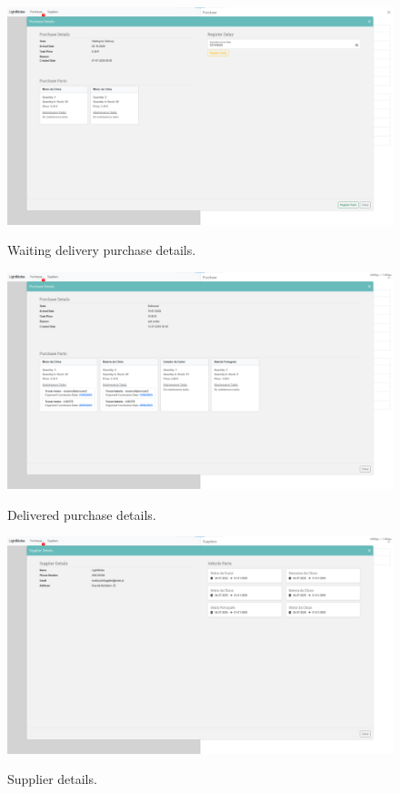 \begin{figure}[htbp]
  \caption{Waiting delivery purchase details.}
  \centering
  \includegraphics[width=\textwidth]{figs/Implementation/warehouse/PurchaseRegisterParts}
  \label{fig:PurchaseRegisterParts}
\end{figure}


\begin{figure}[htbp]
  \caption{Delivered purchase details.}
  \centering
  \includegraphics[width=\textwidth]{figs/Implementation/warehouse/PurchaseFinishedDetails}
  \label{fig:PurchaseFinishedDetails}
\end{figure}



\begin{figure}[htbp]
  \caption{Supplier details.}
  \centering
  \includegraphics[width=\textwidth]{figs/Implementation/warehouse/supplierDetails}
  \label{fig:supplierDetails}
\end{figure}




